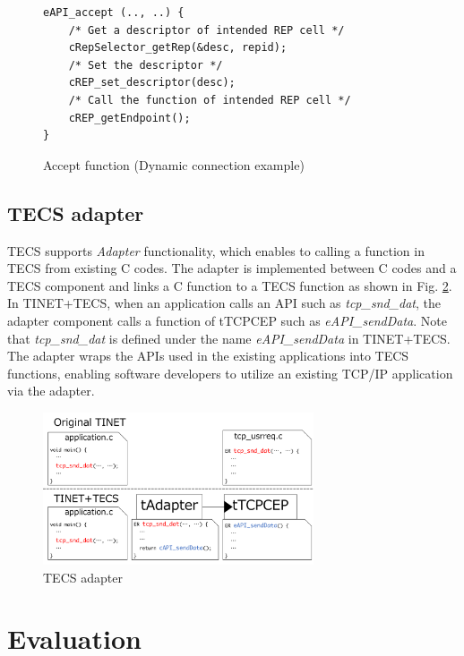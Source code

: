 \documentclass[conference]{IEEEtran/IEEEtran}
\begin{document}
\begin{figure}[t]
\centering
\begin{lstlisting}
eAPI_accept (.., ..) {
    /* Get a descriptor of intended REP cell */
    cRepSelector_getRep(&desc, repid);
    /* Set the descriptor */
    cREP_set_descriptor(desc);
    /* Call the function of intended REP cell */
    cREP_getEndpoint();
}
\end{lstlisting}
\vspace{-1mm} \caption{Accept function (Dynamic connection example)}
\vspace{-1mm} \label{src:DynamicCcode}
\end{figure}

\subsection{TECS adapter}
\label{sec:TECS Adapter}

TECS supports {\it Adapter} functionality, which enables to calling a function in TECS from existing C codes.
The adapter is implemented between C codes and a TECS component and links a C function to a TECS function as shown in Fig. \ref{fig:TECS_Adapter}.
In TINET+TECS, when an application calls an API such as {\it tcp\_snd\_dat}, the adapter component calls a function of tTCPCEP such as {\it eAPI\_sendData}.
Note that {\it tcp\_snd\_dat} is defined under the name {\it eAPI\_sendData} in TINET+TECS.
The adapter wraps the APIs used in the existing applications into TECS functions, enabling software developers to utilize an existing TCP/IP application via the adapter.

\begin{figure}[t]
    \centering
    \includegraphics[width=8.0cm,clip]{figure/TECS_Adapter.pdf}
    \vspace{-1mm} \caption{TECS adapter}
    \vspace{-1mm} \label{fig:TECS_Adapter}
\end{figure}

\section{Evaluation}
\label{sec:Evaluation}
\end{document}
